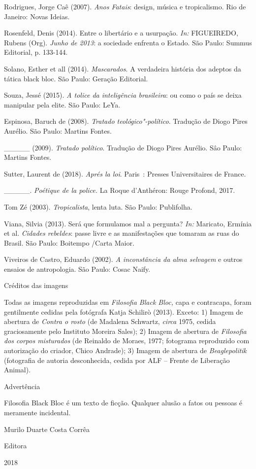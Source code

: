 Rodrigues, Jorge Caê (2007). \emph{Anos Fatais}: design, música e
tropicalismo. Rio de Janeiro: Novas Ideias.

Rosenfeld, Denis (2014). Entre o libertário e a usurpação. \emph{In:
}FIGUEIREDO, Rubens (Org). \emph{Junho de 2013}: a sociedade enfrenta o
Estado. São Paulo: Summus Editorial, p. 133-144.

Solano, Esther et all (2014). \emph{Mascarados}. A verdadeira história
dos adeptos da tática black bloc. São Paulo: Geração Editorial.

Souza, Jessé (2015).\emph{ A tolice da inteligência brasileira}: ou como
o país se deixa manipular pela elite. São Paulo: LeYa.

Espinosa, Baruch de (2008). \emph{Tratado teológico"-político}. Tradução
de Diogo Pires Aurélio. São Paulo: Martins Fontes.

\_\_\_\_\_ (2009). \emph{Tratado político}. Tradução de Diogo Pires
Aurélio. Sâo Paulo: Martins Fontes.

Sutter, Laurent de (2018). \emph{Aprés la loi}. Paris~: Presses
Universitaires de France.

\_\_\_\_\_. \emph{Poétique de la police.} La Roque d'Anthéron: Rouge
Profond, 2017.

Tom Zé (2003). \emph{Tropicalista}, lenta luta. São Paulo: Publifolha.

Viana, Silvia (2013). Será que formulamos mal a pergunta? \emph{In:
}Maricato, Ermínia et al. \emph{Cidades rebeldes}: passe livre e as
manifestações que tomaram as ruas do Brasil. São Paulo: Boitempo /Carta
Maior.

Viveiros de Castro, Eduardo (2002). \emph{A inconstância da alma
selvagem }e outros ensaios de antropologia. São Paulo: Cosac Naify.

Créditos das imagens

Todas as imagens reproduzidas em \emph{Filosofia Black Bloc, }capa e
contracapa, foram gentilmente cedidas pela fotógrafa Katja
Schilirò (2013). Exceto: 1) Imagem de abertura de \emph{Contra o rosto}
(de Madalena Schwartz, \emph{circa} 1975, cedida graciosamente pelo
Instituto Moreira Sales); 2) Imagem de abertura de \emph{Filosofia dos
corpos misturados} (de Reinaldo de Moraes, 1977; fotograma reproduzido
com autorização do criador, Chico Andrade); 3) Imagem de abertura de
\emph{Beaglepolitik} (fotografia de autoria desconhecida, cedida por ALF
-- Frente de Liberação Animal).

Advertência

Filosofia Black Bloc é um texto de ficção. Qualquer alusão a fatos ou
pessoas é meramente incidental.

Murilo Duarte Costa Corrêa


Editora

2018
